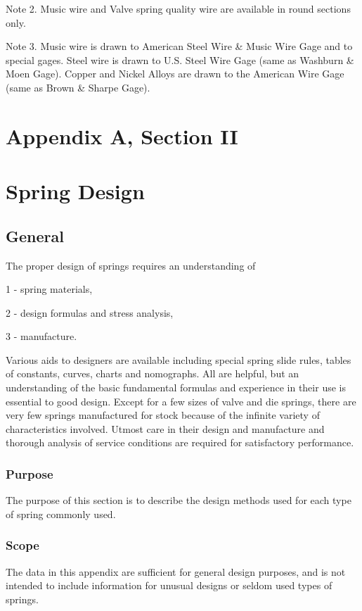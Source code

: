 \documentclass[10pt]{article}
\begin{document}
Note 2. Music wire and Valve spring quality wire are available in round sections only.

Note 3. Music wire is drawn to American Steel Wire \& Music Wire Gage and to special gages. 
Steel wire is drawn to U.S. Steel Wire Gage (same as Washburn \& Moen Gage). 
Copper and Nickel Alloys are drawn to the American Wire Gage (same as Brown \& Sharpe Gage).



\clearpage
\section*{Appendix A, Section II}
\setcounter{section}{19} %
\section{Spring Design} %
\subsection{General} %
The proper design of springs requires an understanding of

1 - spring materials,

2 - design formulas and stress analysis,

3 - manufacture.

\noindent Various aids to designers are available including special spring slide rules, tables of constants, curves, charts and nomographs.
All are helpful, but an understanding of the basic fundamental formulas and experience in their use is essential to good design. 
Except for a few sizes of valve and die springs, there are very few springs manufactured for stock because of the infinite variety of characteristics involved.
Utmost care in their design and manufacture and thorough analysis of service conditions are required for satisfactory performance.
\subsubsection{Purpose} %
The purpose of this section is to describe the design methods used for each type of spring commonly used.

\subsubsection{Scope} %
The data in this appendix are sufficient for general design purposes, and is not intended to include information for unusual designs or seldom used types of springs.
\end{document}
